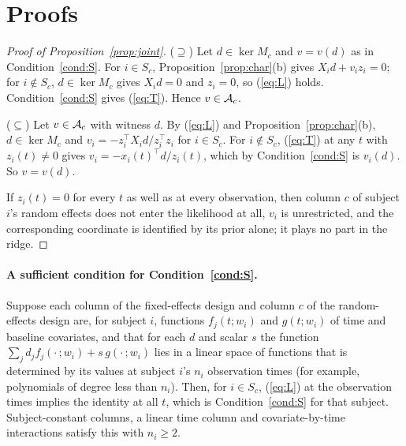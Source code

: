 \section{Proofs}\label{app:proofs}

\begin{proof}[Proof of Proposition~\ref{prop:joint}]
($\supseteq$) Let $d \in \ker M_c$ and $v = v(d)$ as in
Condition~\ref{cond:S}. For $i \in S_c$, Proposition~\ref{prop:char}(b)
gives $X_i d + v_i z_i = 0$; for $i \notin S_c$, $d \in \ker M_c$ gives
$X_i d = 0$ and $z_i = 0$, so (\ref{eq:L}) holds. Condition~\ref{cond:S}
gives (\ref{eq:T}). Hence $v \in \mathcal{A}_c$.

($\subseteq$) Let $v \in \mathcal{A}_c$ with witness $d$. By (\ref{eq:L}) and
Proposition~\ref{prop:char}(b), $d \in \ker M_c$ and $v_i = -z_i^{\top}X_i d
/ z_i^{\top} z_i$ for $i \in S_c$. For $i \notin S_c$, (\ref{eq:T}) at any
$t$ with $z_i(t) \neq 0$ gives $v_i = -x_i(t)^{\top} d / z_i(t)$, which
by Condition~\ref{cond:S} is $v_i(d)$. So $v = v(d)$.

If $z_i(t) = 0$ for every $t$ as well as at every observation, then
column $c$ of subject $i$'s random effects does not enter the likelihood
at all, $v_i$ is unrestricted, and the corresponding coordinate is
identified by its prior alone; it plays no part in the ridge.
\end{proof}

\paragraph{A sufficient condition for Condition~\ref{cond:S}.} Suppose
each column of the fixed-effects design and column $c$ of the
random-effects design are, for subject $i$, functions $f_j(t; w_i)$ and
$g(t; w_i)$ of time and baseline covariates, and that for each $d$ and
scalar $s$ the function $\sum_j d_j f_j(\cdot\,; w_i) + s\, g(\cdot\,; w_i)$
lies in a linear space of functions that is determined by its values at
subject $i$'s $n_i$ observation times (for example, polynomials of degree
less than $n_i$). Then, for $i \in S_c$, (\ref{eq:L}) at the observation
times implies the identity at all $t$, which is Condition~\ref{cond:S} for
that subject. Subject-constant columns, a linear time column and
covariate-by-time interactions satisfy this with $n_i \geq 2$.
